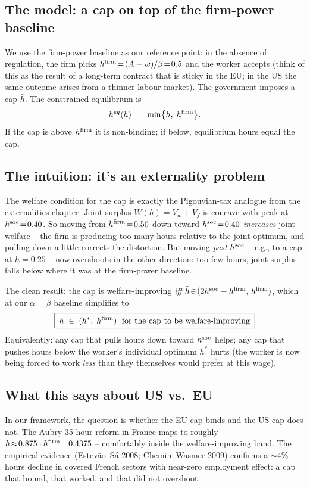 \documentclass[11pt,a4paper]{article}
\begin{document}
\subsection{The model: a cap on top of the firm-power baseline}

We use the firm-power baseline as our reference point: in the absence
of regulation, the firm picks $h^{\rm firm}\!=\!(A-w)/\beta\!=\!0.5$
and the worker accepts (think of this as the result of a long-term
contract that is sticky in the EU; in the US the same outcome arises
from a thinner labour market). The government imposes a cap $\bar h$.
The constrained equilibrium is
\[
h^{eq}(\bar h)\;=\;\min\bigl\{\bar h,\;h^{\rm firm}\bigr\}.
\]
If the cap is above $h^{\rm firm}$ it is non-binding; if below,
equilibrium hours equal the cap.

\subsection{The intuition: it's an externality problem}

The welfare condition for the cap is exactly the Pigouvian-tax
analogue from the externalities chapter. Joint surplus
$W(h)\!=\!V_w+V_f$ is concave with peak at $h^{\rm soc}\!=\!0.40$. So
moving from $h^{\rm firm}\!=\!0.50$ down toward $h^{\rm soc}\!=\!0.40$
\emph{increases} joint welfare -- the firm is producing too many hours
relative to the joint optimum, and pulling down a little corrects the
distortion. But moving \emph{past} $h^{\rm soc}$ -- e.g., to a cap at
$h\!=\!0.25$ -- now overshoots in the other direction: too few hours,
joint surplus falls below where it was at the firm-power baseline.

The clean result: the cap is welfare-improving \emph{iff}
$\bar h\!\in\!(2h^{\rm soc}-h^{\rm firm},\,h^{\rm firm})$, which at our
$\alpha=\beta$ baseline simplifies to
\[
\boxed{\;\bar h\;\in\;(h^\ast,\;h^{\rm firm})\;\text{ for the cap to be
welfare-improving}\;}
\]
Equivalently: any cap that pulls hours down toward $h^{\rm soc}$ helps;
any cap that pushes hours below the worker's individual optimum $h^\ast$
hurts (the worker is now being forced to work \emph{less} than they
themselves would prefer at this wage).

\subsection{What this says about US vs.\ EU}

In our framework, the question is whether the EU cap binds and the US
cap does not. The Aubry 35-hour reform in France maps to roughly
$\bar h\!\approx\!0.875\cdot h^{\rm firm}\!=\!0.4375$ -- comfortably
inside the welfare-improving band. The empirical evidence
(Estev\~ao--S\'a 2008; Chemin--Wasmer 2009) confirms a $\sim\!4\%$
hours decline in covered French sectors with near-zero employment
effect: a cap that bound, that worked, and that did not overshoot.
\end{document}
